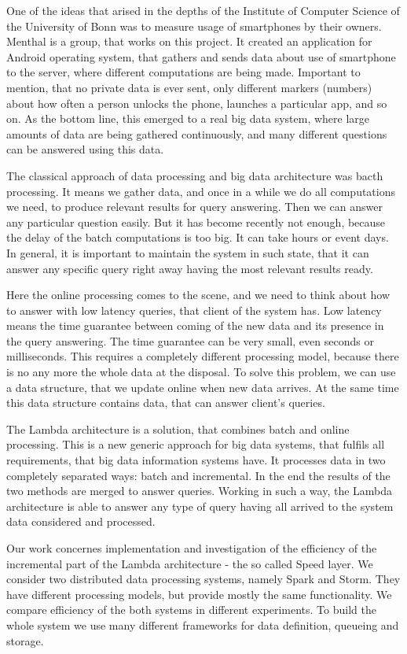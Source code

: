 One of the ideas that arised in the depths of the Institute of Computer Science of the University of Bonn was to measure usage of smartphones by their owners.
Menthal is a group, that works on this project.
It created an application for Android operating system, that gathers and sends data about use of smartphone to the server, where different computations are being made.
Important to mention, that no private data is ever sent, only different markers (numbers) about how often a person unlocks the phone, launches a particular app, and so on.
As the bottom line, this emerged to a real big data system, where large amounts of data are being gathered continuously, and many different questions can be answered using this data.

The classical approach of data processing and big data architecture was bacth processing.
It means we gather data, and once in a while we do all computations we need, to produce relevant results for query answering.
Then we can answer any particular question easily.
But it has become recently not enough, because the delay of the batch computations is too big.
It can take hours or event days.
In general, it is important to maintain the system in such state, that it can answer any specific query right away having the most relevant results ready.

Here the online processing comes to the scene, and we need to think about how to answer with low latency queries, that client of the system has.
Low latency means the time guarantee between coming of the new data and its presence in the query answering.
The time guarantee can be very small, even seconds or milliseconds.
This requires a completely different processing model, because there is no any more the whole data at the disposal.
To solve this problem, we can use a data structure, that we update online when new data arrives.
At the same time this data structure contains data, that can answer client's queries.

The Lambda architecture is a solution, that combines batch and online processing.
This is a new generic approach for big data systems, that fulfils all requirements, that big data information systems have.
It processes data in two completely separated ways: batch and incremental.
In the end the results of the two methods are merged to answer queries.
Working in such a way, the Lambda architecture is able to answer any type of query having all arrived to the system data considered and processed.

Our work concernes implementation and investigation of the efficiency of the incremental part of the Lambda architecture - the so called Speed layer.
We consider two distributed data processing systems, namely Spark and Storm.
They have different processing models, but provide mostly the same functionality.
We compare efficiency of the both systems in different experiments.
To build the whole system we use many different frameworks for data definition, queueing and storage.

